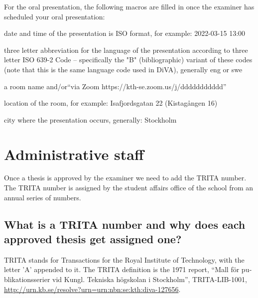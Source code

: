 For the oral presentation, the following macros are filled in once the examiner has scheduled your oral presentation:
\begin{description}[leftmargin=!, labelwidth =\widthof{\texttt{\textbackslash presentationDateAndTimeISO\{\}}}]
\item [\texttt{\textbackslash presentationDateAndTimeISO\{\}}] date and time of the presentation is ISO format, for example: 2022-03-15 13:00
\item [\texttt{\textbackslash presentationLanguage\{\}}] three letter abbreviation for the language of the presentation according to three letter ISO 639-2 Code – specifically the "B" (bibliographic) variant of these codes (note that this is the same language code used in DiVA), generally eng or swe
\item [\texttt{\textbackslash presentationRoom\{\}}] a room name and/or\hspace*{\fill}\linebreak[4] ``via Zoom https://kth-se.zoom.us/j/ddddddddddd''
\item [\texttt{\textbackslash presentationAddress\{\}}] location of the room, for example: Isafjordsgatan 22 (Kistagången 16)
\item [\texttt{\textbackslash presentationCity\{\}}] city where the presentation occurs, generally: Stockholm
\end{description}


\section{Administrative staff}
\label{sec:adminStaff}

Once a thesis is approved by the examiner we need to add the TRITA number. The TRITA number is assigned by the student affairs office of the school from an annual series of numbers.

\subsection{What is a TRITA number and why does each approved thesis get assigned one?}

TRITA stands for Transactions for the Royal Institute of Technology, with the letter 'A' appended to it. The TRITA definition is the 1971 report, ``\foreignlanguage{swedish}{Mall för publikationsserier vid Kungl. Tekniska högskolan i Stockholm}'', TRITA-LIB-1001, \url{http://urn.kb.se/resolve?urn=urn:nbn:se:kth:diva-127656}.

